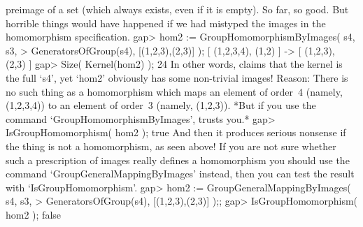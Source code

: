 preimage of a set (which always exists, even if it  is empty). So far, so
good.  But horrible things  would  have happened  if we  had mistyped the
images in the homomorphism specification.
\beginexample
    gap> hom2 := GroupHomomorphismByImages( s4, s3,
    >            GeneratorsOfGroup(s4), [(1,2,3),(2,3)] );
    [ (1,2,3,4), (1,2) ] -> [ (1,2,3), (2,3) ]
    gap> Size( Kernel(hom2) );
    24
\endexample
In  other  words, {\GAP} claims   that the kernel   is the full `s4', yet
`hom2'  obviously has some non-trivial images!   Reason: There is no such
thing  as a  homomorphism which   maps an   element of order~4   (namely,
(1,2,3,4)) to  an element of order~3 (namely,  (1,2,3)). *But  if you use
the command `GroupHomomorphismByImages', {\GAP} trusts you.*
\beginexample
    gap> IsGroupHomomorphism( hom2 );
    true
\endexample
And then it produces serious nonsense if the thing is not a homomorphism,
as seen above! If you are not sure whether such  a prescription of images
really  defines  a    homomorphism    you    should use  the      command
`GroupGeneralMappingByImages' instead, then  you can test the result with
`IsGroupHomomorphism'.
\beginexample
    gap> hom2 := GroupGeneralMappingByImages( s4, s3,
    >            GeneratorsOfGroup(s4), [(1,2,3),(2,3)] );;
    gap> IsGroupHomomorphism( hom2 );
    false
\endexample

